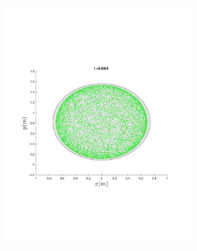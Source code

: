 \begin{figure}
{\begin{subfigure}{0.5\textwidth}
\begin{subfigure}[b]{0.5\textwidth}
        \includegraphics[trim={1cm 7cm 1cm 7cm},
        width=\textwidth]{figures/method/FunnelSimOverlaid12funnel-1}
      \end{subfigure}%
      \begin{subfigure}[b]{0.5\textwidth}

\end{subfigure}
\end{subfigure}}
\end{figure}
